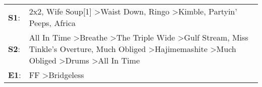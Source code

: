 \begin{supertabular}{p{0.03\textwidth}p{0.92\textwidth}}
 \textbf{S1}:  &                                                                                                                                                                                                                    2x2\textsuperscript{}, \enspace Wife Soup[1]\textsuperscript{} \textgreater \enspace Waist Down\textsuperscript{}, \enspace Ringo\textsuperscript{} \textgreater \enspace Kimble\textsuperscript{}, \enspace Partyin' Peeps\textsuperscript{}, \enspace Africa\textsuperscript{}  \enspace  \\
 \textbf{S2}:  &  All In Time\textsuperscript{} \textgreater \enspace Breathe\textsuperscript{} \textgreater \enspace The Triple Wide\textsuperscript{} \textgreater \enspace Gulf Stream\textsuperscript{}, \enspace Miss Tinkle's Overture\textsuperscript{}, \enspace Much Obliged\textsuperscript{} \textgreater \enspace Hajimemashite\textsuperscript{} \textgreater \enspace Much Obliged\textsuperscript{} \textgreater \enspace Drums\textsuperscript{} \textgreater \enspace All In Time\textsuperscript{}  \enspace  \\
 \textbf{E1}:  &                                                                                                                                                                                                                                                                                                                                                                                                                             FF\textsuperscript{} \textgreater \enspace Bridgeless\textsuperscript{}  \enspace  \\
\end{supertabular}
